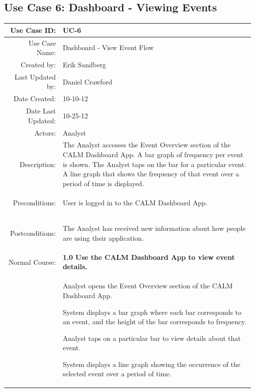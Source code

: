 \documentclass[12pt,oneside,letterpaper]{article}
\newenvironment{packed_enumerate}{ %
\vspace{-7mm}
\begin{enumerate}
  \setlength{\itemsep}{0pt}
  \setlength{\parskip}{0pt}
  \setlength{\parsep}{0pt}
}{\end{enumerate}
\vspace{-8mm}}
\begin{document}
\subsection{\label{DashboardEventFlow}Use Case 6: Dashboard - Viewing Events}
\begin{longtable}{|r|p{3.8in}|}
\hline
Use Case ID:&UC-6\\
\hline
Use Case Name:&Dashboard - View Event Flow\\
\hline
Created by:&Erik Sandberg\\
\hline
Last Updated by:&Daniel Crawford\\
\hline
Date Created:&10-10-12\\
\hline
Date Last Updated:&10-25-12\\
\hline
Actors:&Analyst\\
\hline
Description:&The Analyst accesses the Event Overview section of the CALM 
Dashboard App. A bar graph of frequency per event is shown. The Analyst taps on the bar for a particular event. A line graph that shows the frequency of that event over a period of time is displayed.\\
\hline
Preconditions:&
\begin{packed_enumerate}
\item User is logged in to the CALM Dashboard App.
\end{packed_enumerate}\\
\hline
Postconditions:&
\begin{packed_enumerate}
\item The Analyst has received new information about how people are 
using their application.
\end{packed_enumerate}\\
\hline
Normal Course:&\textbf{1.0 Use the CALM Dashboard App to view event details.}\\
&
\begin{packed_enumerate}
\item Analyst opens the Event Overview section of the CALM Dashboard App.
\item \label{displayEvents1}System displays a bar graph where each bar corresponds to an event, and the height of the bar corresponds to frequency.
\item \label{selectEvent}Analyst taps on a particular bar to view details about that event.
\item \label{displayEvents2}System displays a line graph showing the occurrence of the selected event over a period of time.

\end{packed_enumerate}
\end{longtable}
\end{document}

